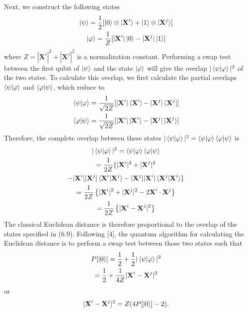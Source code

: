 \documentclass[twocolumn, english]{revtex4-2}
\numberwithin{equation}{section}
\begin{document}
Next, we construct the following states
\begin{equation}\begin{gathered}
\ket{\psi}=\frac{1}{2}[\ket{0}\otimes\ket{\textbf{X}^{i}}+\ket{1}\otimes\ket{\textbf{X}^{j}}]\\
\ket{\varphi}=\frac{1}{Z}[|\textbf{X}^{i}|\ket{0} - |\textbf{X}^{j}|\ket{1}]
\end{gathered}\end{equation}
where $Z = |\textbf{X}^{i}|^2+|\textbf{X}^{j}|^2$ is a normalization constant. Performing a swap test between the first qubit of $\ket{\psi}$ and the state $\ket{\varphi}$ will give the overlap $|\braket{\psi|\varphi}|^2$ of the two states. To calculate this overlap, we first calculate the partial overlaps $\braket{\psi|\varphi}$ and $\braket{\varphi|\psi}$, which reduce to
\begin{equation}\begin{gathered}
\braket{\psi|\varphi} = \frac{1}{\sqrt{2Z}}[|\textbf{X}^{i}|\bra{\textbf{X}^{i}} - |\textbf{X}^{j}|\bra{\textbf{X}^{j}}]\\
\braket{\varphi|\psi} = \frac{1}{\sqrt{2Z}}[|\textbf{X}^{i}|\ket{\textbf{X}^{i}} - |\textbf{X}^{j}|\ket{\textbf{X}^{j}}]
\end{gathered}\end{equation}
Therefore, the complete overlap between these states $|\braket{\psi|\varphi}|^{2} = \braket{\psi|\varphi}\braket{\varphi|\psi}$ is
\begin{equation}\begin{gathered}
|\braket{\psi|\varphi}|^{2} = \braket{\psi|\varphi}\braket{\varphi|\psi}\\
=\frac{1}{2Z}\{|\textbf{X}^{i}|^2+|\textbf{X}^{j}|^2\\-|\textbf{X}^{i}||\textbf{X}^{j}|\braket{\textbf{X}^{i}|\textbf{X}^{j}}-|\textbf{X}^{j}||\textbf{X}^{i}|\braket{\textbf{X}^{j}|\textbf{X}^{i}}\}\\
=\frac{1}{2Z}\left\{|\textbf{X}^{i}|^2+|\textbf{X}^{j}|^2-2\textbf{X}^{i}\cdot\textbf{X}^{j}\right\}\\
=\frac{1}{2Z}\left\{|\textbf{X}^{i}-\textbf{X}^{j}|^2\right\}
\end{gathered}\end{equation}
The classical Euclidean distance is therefore proportional to the overlap of the states specified in (6.9). Following [4], the quantum algorithm for calculating the Euclidean distance is to perform a swap test between those two states such that
\begin{equation}\begin{gathered}
P[\ket{0}] =  \frac{1}{2}+\frac{1}{2}|\braket{\psi|\varphi}|^2\\
= \frac{1}{2} + \frac{1}{4Z}|\textbf{X}^{i}-\textbf{X}^{j}|^2
\end{gathered}\end{equation}
or
\begin{equation}
|\textbf{X}^{i}-\textbf{X}^{j}|^2=Z(4P[\ket{0}]-2).
\end{equation}
\end{document}
